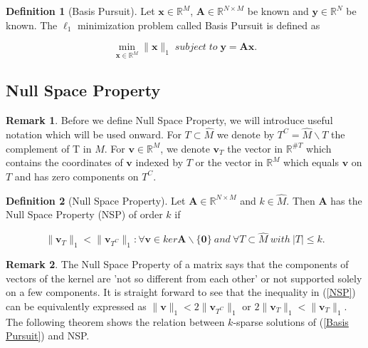 \documentclass[11pt,american]{book} %
\theoremstyle{plain}
\theoremstyle{definition}
\newtheorem{defn}{Definition}
\newtheorem{rmrk}{Remark}
\begin{document}
\begin{defn}[Basis Pursuit]
	Let $\bm{x} \in \mathbb{R}^{M}$, $\bm{A} \in \mathbb{R}^{N \times M}$ be known and $\bm{y} \in \mathbb{R}^{N}$ be known. The $\ell_{1}$ minimization problem called Basis Pursuit is defined as
	
	\begin{equation}
		\min_{\bm{{x}} \in \mathbb{R}^{M}}\lVert \bm{x}\rVert_{1} \;subject\; to\; \bm{y} = \bm{A} \bm{x}. \label{Basis Pursuit}
	\end{equation}
\end{defn}

\subsection*{Null Space Property}

\begin{rmrk}
	Before we define Null Space Property, we will introduce useful notation which will be used onward. For $T\subset \hat{M}$ we denote by $T^{C} = \hat{M} \backslash T$ the complement of T in $\hat{M}$. For $\bm{v} \in \mathbb{R}^M$, we denote $\bm{v}_{T}$ the vector in $\mathbb{R}^{\#T}$ which contains the coordinates of $\bm{v}$ indexed by $T$ or the vector in $\mathbb{R}^{M}$ which equals $\bm{v}$ on $T$ and has zero components on $T^{C}$. %
\end{rmrk}

\begin{defn}[Null Space Property]
	Let $\bm{A} \in \mathbb{R}^{N \times M}$ and $k \in \hat{M}$. Then $\bm{A}$ has the Null Space Property (NSP) of order $k$ if
	
	\begin{equation}
		\lVert \bm{v}_{T}\rVert_{1} <  \lVert \bm{v}_{{T}^{C}}\rVert_{1}: \forall \bm{v} \in ker \bm{A} \backslash \{\bm{0}\} \ and \ \forall T \subset \hat{M} \ with \ |T|\leqslant k. \label{NSP}
	\end{equation}
	
\end{defn}

\begin{rmrk}
	The Null Space Property of a matrix says that the components of vectors of the kernel are 'not so different from each other' or not supported solely on a few components. It is straight forward to see that the inequality in (\ref{NSP}) can be equivalently expressed as $\lVert \bm{v}\rVert_{1} <  2\lVert \bm{v}_{{T}^{C}}\rVert_{1}$ or $2\lVert \bm{v}_{T}\rVert_{1} <  \lVert \bm{v}_{{T}}\rVert_{1}$. The following theorem shows the relation between $k$-sparse solutions of (\ref{Basis Pursuit}) and NSP.
\end{rmrk}
\end{document}
